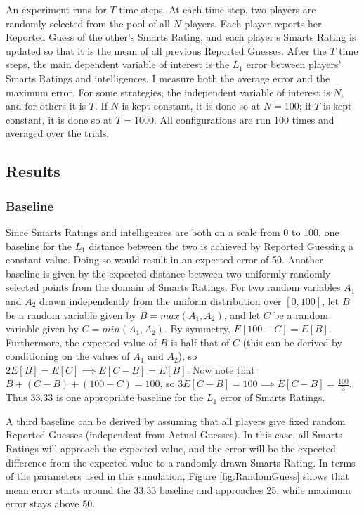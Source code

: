 An experiment runs for $T$ time steps. At each time step, two players are randomly selected from the pool of all $N$ players. Each player reports her Reported Guess of the other's Smarts Rating, and each player's Smarts Rating is updated so that it is the mean of all previous Reported Guesses. After the $T$ time steps, the main dependent variable of interest is the $L_1$ error between players' Smarts Ratings and intelligences. I measure both the average error and the maximum error. For some strategies, the independent variable of interest is $N$, and for others it is $T$. If $N$ is kept constant, it is done so at $N=100$; if $T$ is kept constant, it is done so at $T = 1000$. All configurations are run 100 times and averaged over the trials.

\subsection{Results}

\subsubsection{Baseline}

Since Smarts Ratings and intelligences are both on a scale from 0 to 100, one baseline for the $L_1$ distance between the two is achieved by Reported Guessing a constant value. Doing so would result in an expected error of 50. Another baseline is given by the expected distance between two uniformly randomly selected points from the domain of Smarts Ratings. For two random variables $A_1$ and $A_2$ drawn independently from the uniform distribution over $[0, 100]$, let $B$ be a random variable given by $B = max(A_1, A_2)$, and let $C$ be a random variable given by $C = min(A_1, A_2)$. By symmetry, $E[100 - C] = E[B]$. Furthermore, the expected value of $B$ is half that of $C$ (this can be derived by conditioning on the values of $A_1$ and $A_2$), so $2E[B] = E[C] \implies E[C-B] = E[B]$. Now note that $B + (C-B) + (100-C) = 100$, so $3E[C-B] = 100 \implies E[C-B] = \frac{100}{3}$. Thus $33.33$ is one appropriate baseline for the $L_1$ error of Smarts Ratings.

A third baseline can be derived by assuming that all players give fixed random Reported Guesses (independent from Actual Guesses). In this case, all Smarts Ratings will approach the expected value, and the error will be the expected difference from the expected value to a randomly drawn Smarts Rating. In terms of the parameters used in this simulation, Figure \ref{fig:RandomGuess} shows that mean error starts around the 33.33 baseline and approaches 25, while maximum error stays above 50. 


